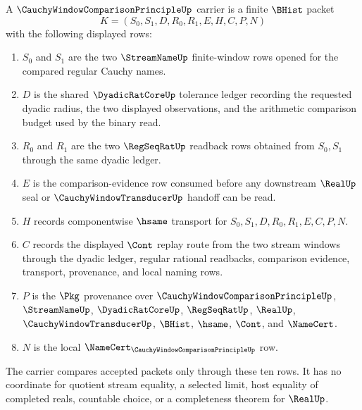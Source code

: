 \begin{definition}
\label{def:cauchy-window-comparison-principle-carrier}
A $\CauchyWindowComparisonPrincipleUp$ carrier is a finite $\BHist$ packet
$$
K=(S_0,S_1,D,R_0,R_1,E,H,C,P,N)
$$
with the following displayed rows:
\begin{enumerate}
\item $S_0$ and $S_1$ are the two $\StreamNameUp$ finite-window rows opened for the compared regular Cauchy names.
\item $D$ is the shared $\DyadicRatCoreUp$ tolerance ledger recording the requested dyadic radius, the two displayed observations, and the arithmetic comparison budget used by the binary read.
\item $R_0$ and $R_1$ are the two $\RegSeqRatUp$ readback rows obtained from $S_0,S_1$ through the same dyadic ledger.
\item $E$ is the comparison-evidence row consumed before any downstream $\RealUp$ seal or $\CauchyWindowTransducerUp$ handoff can be read.
\item $H$ records componentwise $\hsame$ transport for $S_0,S_1,D,R_0,R_1,E,C,P,N$.
\item $C$ records the displayed $\Cont$ replay route from the two stream windows through the dyadic ledger, regular rational readbacks, comparison evidence, transport, provenance, and local naming rows.
\item $P$ is the $\Pkg$ provenance over $\CauchyWindowComparisonPrincipleUp$, $\StreamNameUp$, $\DyadicRatCoreUp$, $\RegSeqRatUp$, $\RealUp$, $\CauchyWindowTransducerUp$, $\BHist$, $\hsame$, $\Cont$, and $\NameCert$.
\item $N$ is the local $\NameCert_{\CauchyWindowComparisonPrincipleUp}$ row.
\end{enumerate}
The carrier compares accepted packets only through these ten rows. It has no coordinate for quotient stream equality, a selected limit, host equality of completed reals, countable choice, or a completeness theorem for $\RealUp$.
\end{definition}

